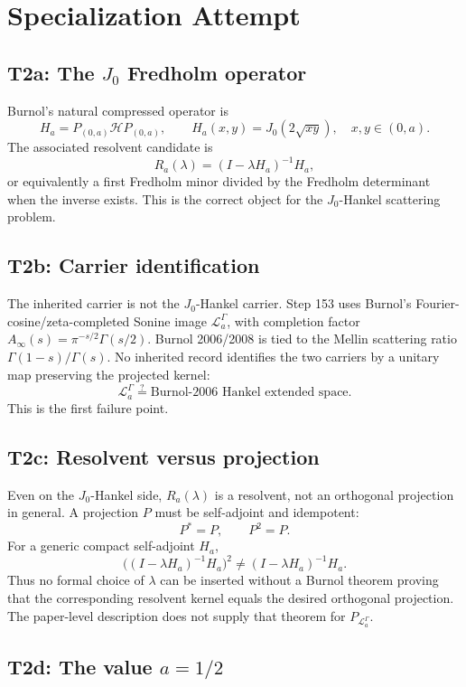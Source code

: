 \documentclass[11pt]{article}
\newcommand{\Ha}{H_a}
\newcommand{\PL}{P_{\mathcal L_a^\Gamma}}
\newcommand{\Ainf}{A_\infty}
\begin{document}
\section*{Specialization Attempt}

\subsection*{T2a: The \(J_0\) Fredholm operator}

Burnol's natural compressed operator is
\[
\Ha=P_{(0,a)}\mathcal H P_{(0,a)},
\qquad
\Ha(x,y)=J_0(2\sqrt{xy}),\quad x,y\in(0,a).
\]
The associated resolvent candidate is
\[
R_a(\lambda)= (I-\lambda \Ha)^{-1}\Ha,
\]
or equivalently a first Fredholm minor divided by the Fredholm determinant when the inverse exists.  This is the correct object for the \(J_0\)-Hankel scattering problem.

\subsection*{T2b: Carrier identification}

The inherited carrier is not the \(J_0\)-Hankel carrier.  Step 153 uses Burnol's Fourier-cosine/zeta-completed Sonine image \(\mathcal L_a^\Gamma\), with completion factor \(\Ainf(s)=\pi^{-s/2}\Gamma(s/2)\).  Burnol 2006/2008 is tied to the Mellin scattering ratio \(\Gamma(1-s)/\Gamma(s)\).  No inherited record identifies the two carriers by a unitary map preserving the projected kernel:
\[
\mathcal L_a^\Gamma
\stackrel{?}{=}
\text{Burnol-2006 Hankel extended space}.
\]
This is the first failure point.

\subsection*{T2c: Resolvent versus projection}

Even on the \(J_0\)-Hankel side, \(R_a(\lambda)\) is a resolvent, not an orthogonal projection in general.  A projection \(P\) must be self-adjoint and idempotent:
\[
P^*=P,\qquad P^2=P.
\]
For a generic compact self-adjoint \(\Ha\),
\[
\bigl((I-\lambda \Ha)^{-1}\Ha\bigr)^2
\ne
(I-\lambda \Ha)^{-1}\Ha.
\]
Thus no formal choice of \(\lambda\) can be inserted without a Burnol theorem proving that the corresponding resolvent kernel equals the desired orthogonal projection.  The paper-level description does not supply that theorem for \(\PL\).

\subsection*{T2d: The value \(a=1/2\)}
\end{document}
